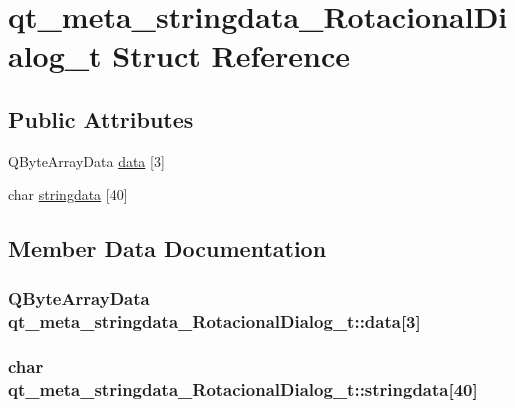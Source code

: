 \hypertarget{structqt__meta__stringdata___rotacional_dialog__t}{\section{qt\-\_\-meta\-\_\-stringdata\-\_\-\-Rotacional\-Dialog\-\_\-t Struct Reference}
\label{structqt__meta__stringdata___rotacional_dialog__t}
}
\subsection*{Public Attributes}
\begin{DoxyCompactItemize}
\item 
Q\-Byte\-Array\-Data \hyperlink{structqt__meta__stringdata___rotacional_dialog__t_af84e69f0f9e17c6716ac8306fe8a1dff}{data} \mbox{[}3\mbox{]}
\item 
char \hyperlink{structqt__meta__stringdata___rotacional_dialog__t_a0621389aa1403ccd3d26b518c6f68134}{stringdata} \mbox{[}40\mbox{]}
\end{DoxyCompactItemize}


\subsection{Member Data Documentation}
\hypertarget{structqt__meta__stringdata___rotacional_dialog__t_af84e69f0f9e17c6716ac8306fe8a1dff}{
\subsubsection[{data}]{\setlength{\rightskip}{0pt plus 5cm}Q\-Byte\-Array\-Data qt\-\_\-meta\-\_\-stringdata\-\_\-\-Rotacional\-Dialog\-\_\-t\-::data\mbox{[}3\mbox{]}}}\label{structqt__meta__stringdata___rotacional_dialog__t_af84e69f0f9e17c6716ac8306fe8a1dff}
\hypertarget{structqt__meta__stringdata___rotacional_dialog__t_a0621389aa1403ccd3d26b518c6f68134}{
\subsubsection[{stringdata}]{\setlength{\rightskip}{0pt plus 5cm}char qt\-\_\-meta\-\_\-stringdata\-\_\-\-Rotacional\-Dialog\-\_\-t\-::stringdata\mbox{[}40\mbox{]}}}\label{structqt__meta__stringdata___rotacional_dialog__t_a0621389aa1403ccd3d26b518c6f68134}


